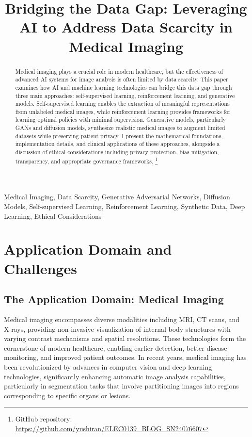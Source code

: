 \documentclass{article}
\title{Bridging the Data Gap: Leveraging AI to Address Data Scarcity in Medical Imaging}
\begin{document}
%
\maketitle
%
\begin{abstract}
Medical imaging plays a crucial role in modern healthcare, but the effectiveness of advanced AI systems for image analysis is often limited by data scarcity. This paper examines how AI and machine learning technologies can bridge this data gap through three main approaches: self-supervised learning, reinforcement learning, and generative models. 
Self-supervised learning enables the extraction of meaningful representations from unlabeled medical images, while reinforcement learning provides frameworks for learning optimal policies with minimal supervision. Generative models, particularly GANs and diffusion models, synthesize realistic medical images to augment limited datasets while preserving patient privacy. 
I present the mathematical foundations, implementation details, and clinical applications of these approaches, alongside a discussion of ethical considerations including privacy protection, bias mitigation, transparency, and appropriate governance frameworks. 
\footnote{GitHub repository: \url{https://github.com/yushiran/ELEC0139_BLOG_SN24076607}}
\end{abstract}
%
\begin{keywords}
Medical Imaging, Data Scarcity, Generative Adversarial Networks, Diffusion Models, Self-supervised Learning, Reinforcement Learning, Synthetic Data, Deep Learning, Ethical Considerations
\end{keywords}
%

\section{Application Domain and Challenges}
\label{sec:app_domain}

\subsection{The Application Domain: Medical Imaging}
Medical imaging encompasses diverse modalities including MRI, CT scans, and X-rays, providing non-invasive visualization of internal body structures with varying contrast mechanisms and spatial resolutions. These technologies form the cornerstone of modern healthcare, enabling earlier detection, better disease monitoring, and improved patient outcomes. In recent years, medical imaging has been revolutionized by advances in computer vision and deep learning technologies\cite{upadhyayAdvancesDeepLearning2024}, significantly enhancing automatic image analysis capabilities, particularly in segmentation tasks that involve partitioning images into regions corresponding to specific organs or lesions\cite{sushankiReviewComputationalMethods2024}.
\end{document}
